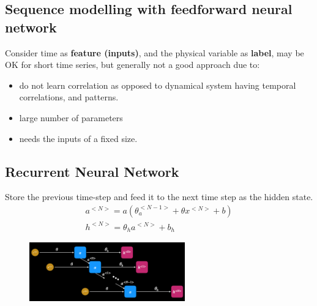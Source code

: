 \documentclass[a4paper,10pt]{article}
\begin{document}
\subsection{Sequence modelling with feedforward neural network}
Consider time as \textbf{feature (inputs)}, and the physical variable as \textbf{label}, may be OK for short time series, but generally not a good approach due to:
\begin{itemize}
    \item do not learn correlation as opposed to dynamical system having temporal correlations, and patterns. 
    \item large number of parameters
    \item needs the inputs of a fixed size. 
\end{itemize}

\subsection{Recurrent Neural Network}
Store the previous time-step and feed it to the next time step as the hidden state.
\vspace*{0.3cm}
\begin{gather*}
    a^{<N>} = a(\theta_a^{<N-1>}+\theta x^{<N>}+b)\\
    h^{<N>} = \theta_ha^{<N>}+b_h
\end{gather*}

\vspace*{-0.3cm}
\begin{figure}[ht]
    \centering
    \includegraphics[width =0.6\textwidth]{RC.png}
\end{figure}
\end{document}
